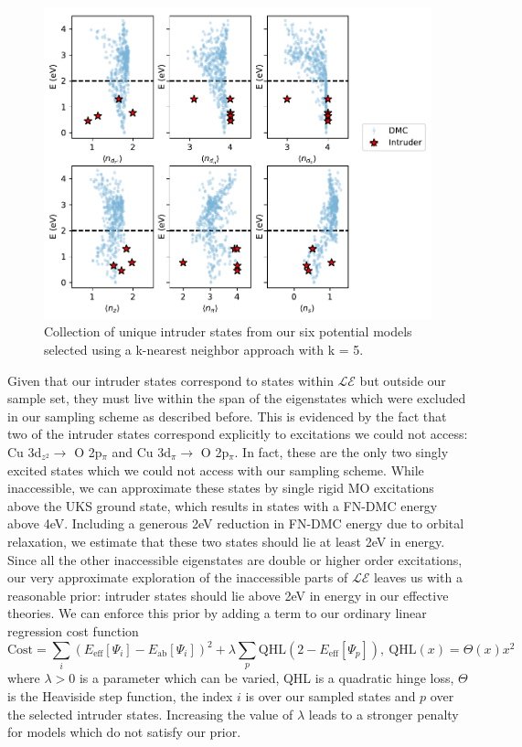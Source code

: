 \documentclass{article}
\begin{document}
\begin{figure}[H]
\centering
\includegraphics[width=0.7\linewidth]{../qwalk/old/ub3lyp_s1_/analysis/figs/intruder.pdf}
\caption{Collection of unique intruder states from our six potential models selected using a k-nearest neighbor approach with k = 5.}
\label{fig:Intruder}
\end{figure}

Given that our intruder states correspond to states within $\mathcal{LE}$ but outside our sample set, they must live within the span of the eigenstates which were excluded in our sampling scheme as described before.
This is evidenced by the fact that two of the intruder states correspond explicitly to excitations we could not access: Cu 3d$_{z^2} \rightarrow $ O 2p$_\pi$ and  Cu 3d$_\pi \rightarrow $ O 2p$_\pi$.
In fact, these are the only two singly excited states which we could not access with our sampling scheme.
While inaccessible, we can approximate these states by single rigid MO excitations above the UKS ground state, which results in states with a FN-DMC energy above 4eV.
Including a generous 2eV reduction in FN-DMC energy due to orbital relaxation, we estimate that these two states should lie at least 2eV in energy. 
Since all the other inaccessible eigenstates are double or higher order excitations, our very approximate exploration of the inaccessible parts of $\mathcal{LE}$ leaves us with a reasonable prior: intruder states should lie above 2eV in energy in our effective theories.
We can enforce this prior by adding a term to our ordinary linear regression cost function
\begin{equation}
\text{Cost} = \sum_{i} (E_\text{eff}[\Psi_i] - E_\text{ab}[\Psi_i])^2 + \lambda \sum_{p}\text{QHL}(2 - E_\text{eff}[\Psi_p]),\ \text{QHL}(x) = \Theta(x)x^2
\label{eq:cost}
\end{equation}
where $\lambda>0$ is a parameter which can be varied, QHL is a quadratic hinge loss, $\Theta$ is the Heaviside step function, the index $i$ is over our sampled states and $p$ over the selected intruder states.
Increasing the value of $\lambda$ leads to a stronger penalty for models which do not satisfy our prior.
\end{document}
